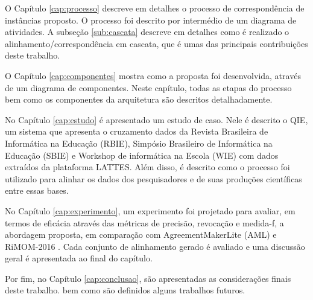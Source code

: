 O Capítulo \ref{cap:processo} descreve em detalhes o processo de correspondência de instâncias proposto. O processo foi descrito por intermédio de um diagrama de atividades. A subseção \ref{sub:cascata} descreve em detalhes como é realizado o alinhamento/correspondência em cascata, que é umas das principais contribuições deste trabalho.

O Capítulo \ref{cap:componentes} mostra como a proposta foi desenvolvida, através de um diagrama de componentes. Neste capítulo, todas as etapas do processo bem como os componentes da arquitetura são descritos detalhadamente.

No Capítulo \ref{cap:estudo} é apresentado um estudo de caso. Nele é descrito o QIE, um sistema que apresenta o cruzamento dados da Revista Brasileira de Informática na Educação (RBIE), Simpósio Brasileiro de Informática na Educação (SBIE) e Workshop de informática na Escola (WIE) com dados extraídos da plataforma LATTES. Além disso, é descrito como o processo foi utilizado para alinhar os dados dos pesquisadores e de suas produções científicas entre essas bases.

No Capítulo \ref{cap:experimento}, um experimento foi projetado para avaliar, em termos de eficácia através das métricas de precisão, revocação e medida-f, a abordagem proposta, em comparação com AgreementMakerLite (AML) \cite{fariaoaei} e RiMOM-2016 \cite{zhang2016rimom}. Cada conjunto de alinhamento gerado é avaliado e uma discussão geral é apresentada ao final do capítulo.

Por fim, no Capítulo \ref{cap:conclusao}, são apresentadas as considerações finais deste trabalho. bem como são definidos alguns trabalhos futuros.
